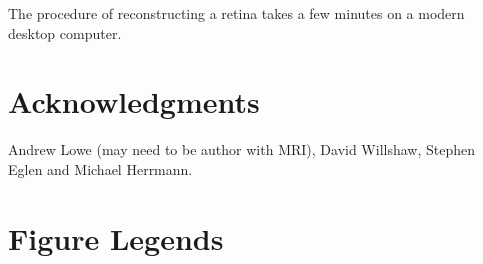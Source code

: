 \documentclass[10pt]{article}
\begin{document}
The procedure of reconstructing a retina takes a few minutes on a
modern desktop computer.

\section*{Acknowledgments}

Andrew Lowe (may need to be author with MRI), David Willshaw, Stephen Eglen and
Michael Herrmann.

\newcommand{\myshortjournaltitles}{}

%

\section*{Figure Legends}
\end{document}
